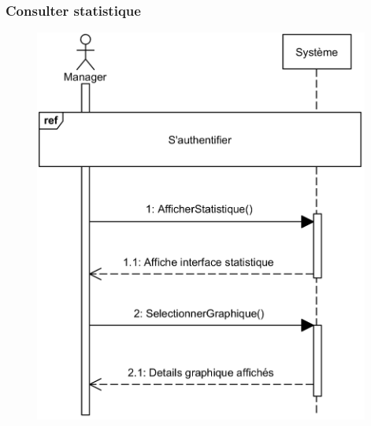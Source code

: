     \subsubsection[Consulter statistique]{Consulter statistique}
        \begin{figure}[H]
            \centering
            \includegraphics[width=110mm]{images/diagramme-de-sequence/sd-statistique.png}
            \label{fig:sdStat}
        \end{figure}
\pagebreak
